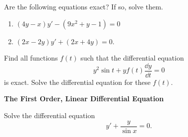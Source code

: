 {\begin{Exercise}
\end{Exercise}








\begin{Exercise}
  \label{exercise 4yxy9x2y10}
  Are the following equations exact?  If so, solve them.
  \begin{enumerate}
  \item
    $ \displaystyle
    (4 y - x) y' - (9 x^2 + y - 1) = 0
    $
  \item
    $ \displaystyle
    (2 x - 2 y) y' + (2 x + 4 y) = 0.
    $
  \end{enumerate}

\end{Exercise}










\begin{Exercise}
  \label{exercise y2 sin t + y f dydt}
  Find all functions $f(t)$ such that the differential equation
  \begin{equation}
    \label{eqn_y2_sint}
    y^2 \sin t + y f(t) \frac{\dd y}{\dd t} = 0
  \end{equation}
  is exact.  Solve the differential equation for these $f(t)$.

\end{Exercise}






\begin{large}
  \noindent
  \textbf{The First Order, Linear Differential Equation}
\end{large}



\begin{Exercise}
  \label{exercise y + y / sin x}
  Solve the differential equation
  \[ 
  y' + \frac{y}{\sin x} = 0. 
  \]

\end{Exercise}




}
